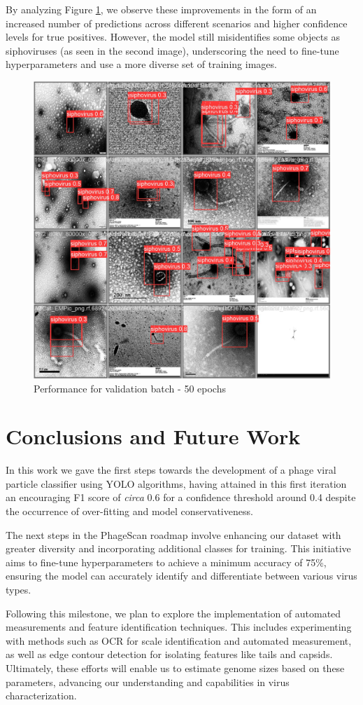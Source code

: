 \documentclass[runningheads]{llncs}
\begin{document}
By analyzing Figure \ref{fig13}, we observe these improvements in the form of an increased number of predictions across different scenarios and higher confidence levels for true positives. However, the model still misidentifies some objects as siphoviruses (as seen in the second image), underscoring the need to fine-tune hyperparameters and use a more diverse set of training images.

\begin{figure}[H]
\begin{center}
\includegraphics[width=.4\textwidth]{./figures/fig13_50e_val_batch0_pred.jpg}
\caption{Performance for validation batch - 50 epochs} \label{fig13}
\end{center}
\end{figure}

\section{Conclusions and Future Work} 
In this work we gave the first steps towards the development of a phage viral particle classifier using YOLO algorithms, having attained in this first iteration an encouraging F1 score of \textit{circa} 0.6 for a confidence threshold around 0.4 despite the occurrence of over-fitting and model conservativeness. 

The next steps in the PhageScan roadmap involve enhancing our dataset with greater diversity and incorporating additional classes for training. This initiative aims to fine-tune hyperparameters to achieve a minimum accuracy of 75\%, ensuring the model can accurately identify and differentiate between various virus types. 

Following this milestone, we plan to explore the implementation of automated measurements and feature identification techniques. This includes experimenting with methods such as OCR for scale identification and automated measurement, as well as edge contour detection for isolating features like tails and capsids. Ultimately, these efforts will enable us to estimate genome sizes based on these parameters, advancing our understanding and capabilities in virus characterization.

\newpage
%
%
%
%


%
\end{document}
